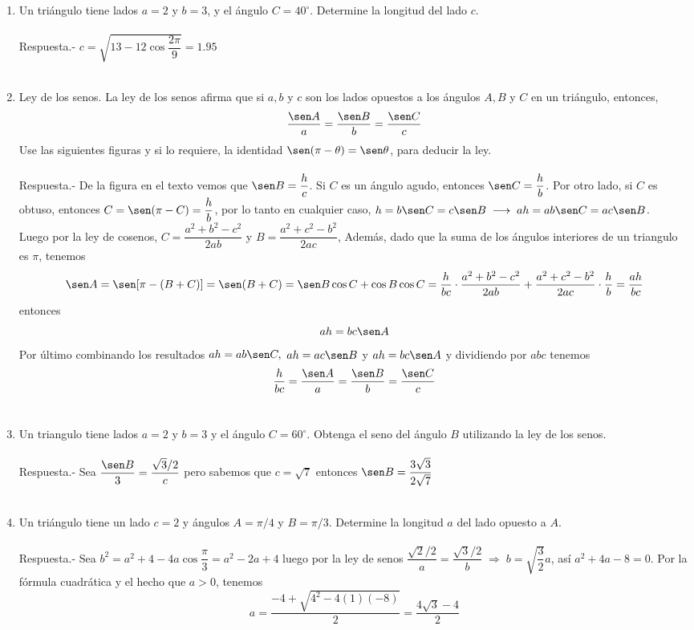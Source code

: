 \begin{enumerate}
\item  Un triángulo tiene lados $a = 2$ y $b = 3$, y el ángulo $C = 40^\circ$. Determine la longitud del lado $c$.\\\\
    Respuesta.-\; $c = \sqrt{13 - 12\cos\dfrac{2\pi}{9}} = 1.95$\\\\

\item Ley de los senos. La ley de los senos afirma que si $a,b$ y $c$ son los lados opuestos a los ángulos $A,B$ y $C$ en un triángulo, entonces, $$\dfrac{\sen A}{a} = \dfrac{\sen B}{b} = \dfrac{\sen C}{c}$$
Use las siguientes figuras y si lo requiere, la identidad $\sen(\pi - \theta) = \sen \theta$, para deducir la ley.\\\\
    Respuesta.-\; De la figura en el texto vemos que $\sen B=\dfrac{h}{c}$. Si $C$ es un ángulo agudo, entonces $\sen C = \dfrac{h}{b}$. Por otro lado, si $C$ es obtuso, entonces $C = \sen(\pi - C) = \dfrac{h}{b}$, por lo tanto en cualquier caso, $h=b \sen C = c \sen B \; \longrightarrow \; ah = ab \sen C = ac \sen B$.\\
    Luego por la ley de cosenos, $C = \dfrac{a^2 + b^2 - c^2}{2ab}$ y $B=\dfrac{a^2 + c^2 - b^2}{2ac}$, Además, dado que la suma de los ángulos interiores de un triangulo es $\pi$, tenemos $$\sen A = \sen [\pi - (B+C)] = \sen(B+C) = \sen B \cos C + \cos B \cos C = \dfrac{h}{bc}\cdot \dfrac{a^2+b^2-c^2}{2ab} + \dfrac{a^2+c^2 - b^2}{2ac}\cdot \dfrac{h}{b} = \dfrac{ah}{bc}$$ entonces $$ah = bc \sen A$$
    Por último combinando los resultados  $ah=ab \sen C,$ $ah=ac \sen B$ y $ah=bc\sen A$ y dividiendo por $abc$ tenemos $$\dfrac{h}{bc} = \dfrac{\sen A}{a} = \dfrac{\sen B}{b} = \dfrac{\sen C}{c}$$\\

\item Un triangulo tiene lados $a=2$ y $b=3$ y el ángulo $C=60^\circ$. Obtenga el seno del ángulo $B$ utilizando la ley de los senos.\\\\
    Respuesta.-\; Sea $\dfrac{\sen B}{3} = \dfrac{\sqrt{3}/2}{c}$ pero sabemos que $c=\sqrt{7}$ entonces $\sen B = \dfrac{3\sqrt{3}}{2\sqrt{7}}$\\\\

\item Un triángulo tiene un lado $c = 2$ y ángulos $A = \pi/4$ y $B = \pi / 3$. Determine la longitud $a$ del lado opuesto a $A$.\\\\
    Respuesta.-\; Sea $b^2 = a^2 + 4 - 4a \cos\dfrac{\pi}{3} = a^2 - 2a + 4$ luego por la ley de senos $\dfrac{\sqrt{2}/2}{a}=\dfrac{\sqrt{3}/2}{b} \; \Longrightarrow \; b = \sqrt{\dfrac{3}{2}} a$, así $a^2 + 4a - 8 = 0$. Por la fórmula cuadrática y el hecho que $a>0$, tenemos $$a=\dfrac{-4+\sqrt{4^2-4(1)(-8)}}{2}=\dfrac{4\sqrt{3}-4}{2}$$\\


\end{enumerate}
